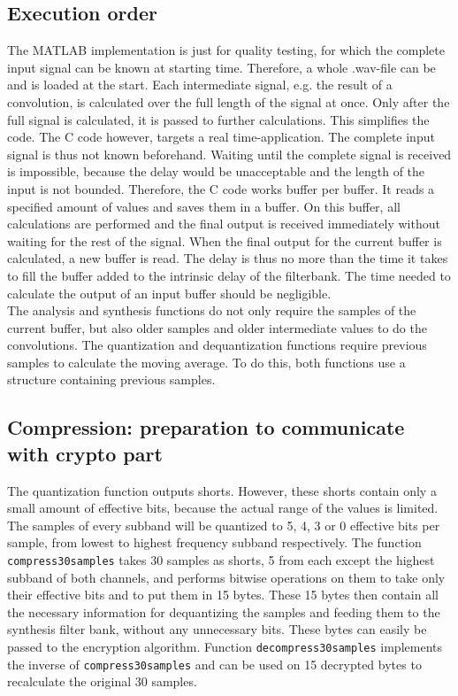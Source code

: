 \documentclass[a4paper]{article}
\begin{document}
\subsection{Execution order}
The MATLAB implementation is just for quality testing, for which the complete input signal can be known at starting time. Therefore, a whole .wav-file can be and is loaded at the start. Each intermediate signal, e.g. the result of a convolution, is calculated over the full length of the signal at once. Only after the full signal is calculated, it is passed to further calculations. This simplifies the code. The C code however, targets a real time-application. The complete input signal is thus not known beforehand. Waiting until the complete signal is received is impossible, because the delay would be unacceptable and the length of the input is not bounded. Therefore, the C code works buffer per buffer. It reads a specified amount of values and saves them in a buffer. On this buffer, all calculations are performed and the final output is received immediately without waiting for the rest of the signal. When the final output for the current buffer is calculated, a new buffer is read. The delay is thus no more than the time it takes to fill the buffer added to the intrinsic delay of the filterbank. The time needed to calculate the output of an input buffer should be negligible. \\

The analysis and synthesis functions do not only require the samples of the current buffer, but also older samples and older intermediate values to do the convolutions. The quantization and dequantization functions require previous samples to calculate the moving average. To do this, both functions use a structure containing previous samples.

\subsection{Compression: preparation to communicate with crypto part}\label{sec:communication}
The quantization function outputs shorts. However, these shorts contain only a small amount of effective bits, because the actual range of the values is limited. The samples of every subband will be quantized to 5, 4, 3 or 0 effective bits per sample, from lowest to highest frequency subband respectively. The function \texttt{compress30samples} takes 30 samples as shorts, 5 from each except the highest subband of both channels, and performs bitwise operations on them to take only their effective bits and to put them in 15 bytes. These 15 bytes then contain all the necessary information for dequantizing the samples and feeding them to the synthesis filter bank, without any unnecessary bits. These bytes can easily be passed to the encryption algorithm. Function \texttt{decompress30samples} implements the inverse of \texttt{compress30samples} and can be used on 15 decrypted bytes to 
recalculate the original 30 samples.	
\end{document}

